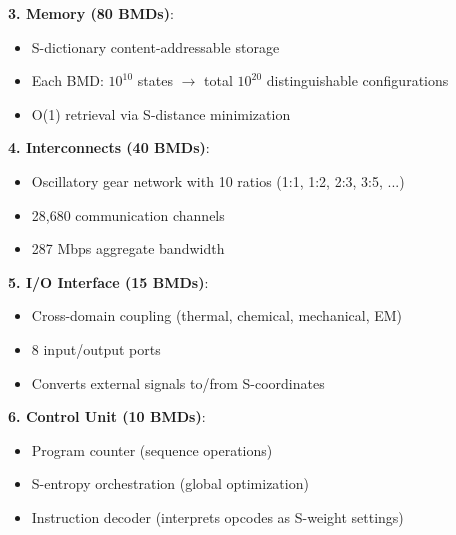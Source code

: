 \documentclass[11pt,a4paper]{article}
\begin{document}
\textbf{3. Memory (80 BMDs)}:
\begin{itemize}
\item S-dictionary content-addressable storage
\item Each BMD: $10^{10}$ states $\to$ total $10^{20}$ distinguishable configurations
\item O(1) retrieval via S-distance minimization
\end{itemize}

\textbf{4. Interconnects (40 BMDs)}:
\begin{itemize}
\item Oscillatory gear network with 10 ratios (1:1, 1:2, 2:3, 3:5, ...)
\item 28,680 communication channels
\item 287 Mbps aggregate bandwidth
\end{itemize}

\textbf{5. I/O Interface (15 BMDs)}:
\begin{itemize}
\item Cross-domain coupling (thermal, chemical, mechanical, EM)
\item 8 input/output ports
\item Converts external signals to/from S-coordinates
\end{itemize}

\textbf{6. Control Unit (10 BMDs)}:
\begin{itemize}
\item Program counter (sequence operations)
\item S-entropy orchestration (global optimization)
\item Instruction decoder (interprets opcodes as S-weight settings)
\end{itemize}
\end{document}
